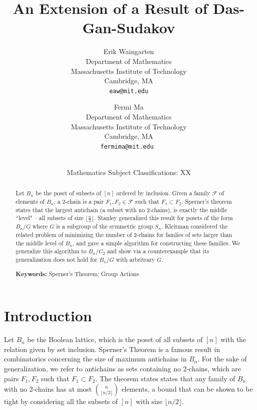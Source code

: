 \documentclass[12pt]{article}
\title{\bf An Extension of a Result of Das-Gan-Sudakov}
\author{Erik Waingarten\\
\small Department of Mathematics\\[-0.8ex]
\small Massachusetts Institute of Technology\\[-0.8ex] 
\small Cambridge, MA\\
\small\tt eaw@mit.edu\\
\and
Fermi Ma\\
\small Department of Mathematics\\[-0.8ex]
\small Massachusetts Institute of Technology\\[-0.8ex]
\small Cambridge, MA\\
\small\tt fermima@mit.edu
}
\date{\dateline{August, 2014}{XX}\\
\small Mathematics Subject Classifications: XX}
\theoremstyle{plain}
\theoremstyle{definition}
\theoremstyle{remark}
\newcommand{\F}{\mathcal{F}}
\begin{document}
\maketitle


\begin{abstract}
Let $B_n$ be the poset of subsets of $[n]$ ordered by inclusion. Given a family $\F$ of elements of $B_n$, a 2-chain is a pair $F_1, F_2 \in \F$ such that $F_1 \subset F_2$. Sperner's theorem states that the largest antichain (a subset with no 2-chains), is exactly the middle ``level" -- all subsets of size $\lfloor \frac{n}{2} \rfloor$. Stanley generalized this result for posets of the form $B_n/G$ where $G$ is a subgroup of the symmetric group $S_n$. Kleitman considered the related problem of minimizing the number of 2-chains for famlies of sets larger than the middle level of $B_n$, and gave a simple algorithm for constructing these families. We generalize this algorithm to $B_n/C_2$ and show via a counterexample that its generalization does not hold for $B_n/G$ with arbritrary $G$.

  \bigskip\noindent \textbf{Keywords:} Sperner's Theorem; Group Actions\end{abstract}

\section{Introduction}

Let $B_n$ be the Boolean lattice, which is the poset of all subsets of $[n]$ with the relation given by set inclusion. Sperner's Theorem is a famous result in combinatorics concerning the size of maximum antichains in $B_n$. For the sake of generalization, we refer to antichains as sets containing no 2-chains, which are pairs $F_1, F_2$ such that $F_1 \subset F_2$. The theorem states states that any family of $B_n$ with no 2-chains has at most $\binom{n}{\lfloor n/2 \rfloor}$ elements, a bound that can be shown to be tight by considering all the subsets of $[n]$ with size $\lfloor n/2 \rfloor$.
\end{document}
